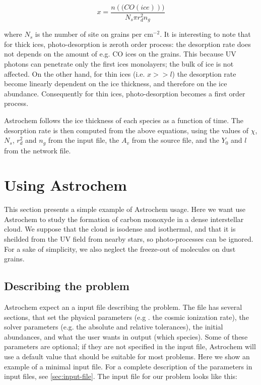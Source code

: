 \documentclass[a4paper,12pt]{article}
\begin{document}
{\begin{equation}
  x = \frac{n(\mathrm(CO(ice)))}{N_{s} \pi r_{d}^2 n_g}
  \label{eq:ice-thickness}
\end{equation}

\noindent
where $N_{s}$ is the number of site on grains per cm$^{-2}$. It is
interesting to note that for thick ices, photo-desorption is zeroth
order process: the desorption rate does not depends on the amount of
e.g. CO ices on the grains. This because UV photons can penetrate only
the first ices monolayers; the bulk of ice is not affected. On the
other hand, for thin ices (i.e. $x >> l$) the desorption rate become
linearly dependent on the ice thickness, and therefore on the ice
abundance. Consequently for thin ices, photo-desorption becomes a
first order process.

Astrochem follows the ice thickness of each species as a function of
time. The desorption rate is then computed from the above equations,
using the values of $\chi$, $N_{s}$, $r_{d}^2$ and $n_g$ from the
input file, the $A_{v}$ from the source file, and the $Y_{0}$ and $l$
from the network file.

\section{Using Astrochem}
\label{sec:using-astrochem}

This section presents a simple example of Astrochem usage. Here we
want use Astrochem to study the formation of carbon monoxyde in a
dense interstellar cloud. We suppose that the cloud is isodense and
isothermal, and that it is sheilded from the UV field from nearby
stars, so photo-processes can be ignored. For a sake of simplicity, we
also neglect the freeze-out of molecules on dust grains.

\subsection{Describing the problem}
\label{sec:describing-problem}

Astrochem expect an a input file describing the problem. The file has
several sections, that set the physical parameters (e.g . the cosmic
ionization rate), the solver parameters (e.g. the absolute and
relative tolerances), the initial abundances, and what the user wants
in output (which species). Some of these parameters are optional; if
they are not specified in the input file, Astrochem will use a default
value that should be suitable for most problems. Here we show an
example of a minimal input file. For a complete description of the
parameters in input files, see \ref{sec:input-file}. The input file for
our problem looks like this:

}
\end{document}
